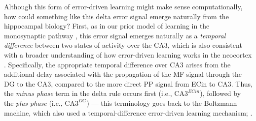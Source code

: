 \documentclass[11pt,twoside]{article}
\newif\myifpdf
\begin{document}
Although this form of error-driven learning might make sense computationally, how could something like this delta error signal emerge naturally from the hippocampal biology?  First, as in our prior model of learning in the monosynaptic pathway \citep{KetzMorkondaOReilly13}, this error signal emerges naturally as a \emph{temporal difference} between two states of activity over the CA3, which is also consistent with a broader understanding of how error-driven learning works in the neocortex \citep{OReilly96,OReillyMunakata00,OReillyRussinZolfagharEtAl21}. Specifically, the appropriate temporal difference over CA3 arises from the additional delay associated with the propagation of the MF signal through the DG to the CA3, compared to the more direct PP signal from ECin to CA3.  Thus, the \emph{minus phase} term in the delta rule occurs first (i.e., $\mbox{CA3}^{ECin}$), followed by the \emph{plus phase} (i.e., $\mbox{CA3}^{DG}$) --- this terminology goes back to the Boltzmann machine, which also used a temporal-difference error-driven learning mechanism; \citep{AckleyHintonSejnowski85}.
\end{document}
